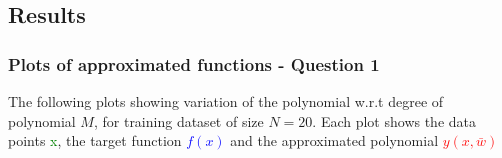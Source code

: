 \documentclass{article}
\makeatletter
\renewcommand\paragraph{\@startsection{paragraph}{4}{\z@}%
            {-2.5ex\@plus -1ex \@minus -.25ex}%
            {1.25ex \@plus .25ex}%
            {\normalfont\normalsize\bfseries}}
\makeatother
\begin{document}
\subsection{Results}

\subsubsection{Plots of approximated functions - Question 1}
The following plots showing variation of the polynomial w.r.t degree of polynomial $M$, for training dataset of size $N = 20$. Each plot shows the data points \textcolor{green}{x}, the target function \textcolor{blue}{$f(x)$}  and the approximated polynomial \textcolor{red}{$y(x,\bar{w})$} 
\end{document}
